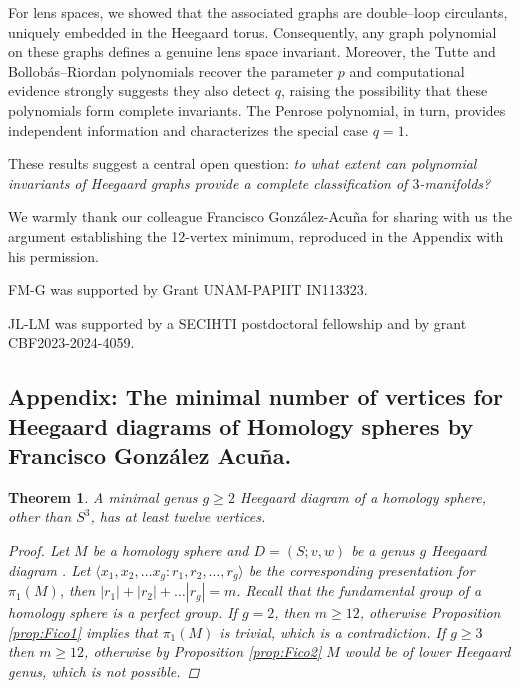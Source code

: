 \documentclass[pdflatex,sn-mathphys-num]{sn-jnl}%
\theoremstyle{plain}
\newtheorem{theorem}{Theorem}
\theoremstyle{definition}
\theoremstyle{remark}
\begin{document}
For lens spaces, we showed that the associated graphs are double–loop circulants, uniquely embedded in the Heegaard torus. Consequently, any graph polynomial on these graphs defines a genuine lens space invariant. Moreover, the Tutte and Bollobás–Riordan polynomials recover the parameter $p$ and computational evidence strongly suggests they also detect $q$, raising the possibility that these polynomials form complete invariants. The Penrose polynomial, in turn, provides independent information and characterizes the special case $q=1$.

 These results suggest a central open question: \emph{to what extent can polynomial invariants of Heegaard graphs provide a complete classification of $3$-manifolds?}

\bigskip

\backmatter


We warmly thank our colleague Francisco González-Acuña for sharing with us the argument establishing the 12-vertex minimum, reproduced in the Appendix with his permission. 

FM-G was supported by Grant UNAM-PAPIIT IN113323.

JL-LM was supported by a SECIHTI postdoctoral fellowship and by grant CBF2023-2024-4059.


\clearpage 

\appendix
\subsection*{Appendix: The minimal number of vertices for Heegaard diagrams of Homology spheres by Francisco González Acuña.}\label{section:appendix}


\begin{theorem}\label{FicoTheorem1}
A minimal genus $g\geq 2$ Heegaard diagram of a homology sphere, other than $S^3$, has at least twelve vertices.
\begin{proof}
Let $M$ be a homology sphere and  $D=(S; v,w)$ be a genus $g$ Heegaard diagram . Let $\langle x_1, x_2, \dots x_g : r_1, r_2, \dots, r_g\rangle$ be the corresponding presentation for $\pi_1(M)$, then $|r_1|+|r_2|+\dots |r_g|=m$. Recall that the fundamental group of a homology sphere is a perfect group. If $g=2$, then $m\geq 12$, otherwise Proposition \ref{prop:Fico1} implies that $\pi_1(M)$ is trivial, which is a contradiction. If $g\geq 3$ then $m\geq 12$, otherwise by Proposition \ref{prop:Fico2} $M$ would be of lower Heegaard genus, which is not possible. 
\end{proof}
\end{theorem} 
\end{document}
